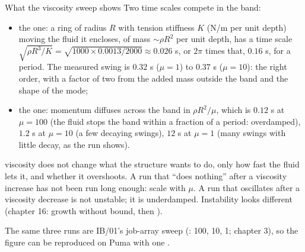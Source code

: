 \documentclass[aspectratio=169,11pt]{beamer}
\begin{document}
\begin{frame}{What the viscosity sweep shows}
\label{fr:musweep3}
\small Two time scales compete in the band:
\begin{itemize}
  \item the  one: a ring of radius $R$ with tension stiffness $K$ (N/m per unit depth) moving the fluid it encloses, of mass $\sim \rho R^2$ per unit depth, has a time scale $\sqrt{\rho R^3/K} = \sqrt{1000 \times 0.0013/2000} \approx 0.026$ s, or $2\pi$ times that, $0.16$ s, for a period. The measured swing is $0.32$ s ($\mu = 1$) to $0.37$ s ($\mu = 10$): the right order, with a factor of two from the added mass outside the band and the shape of the mode;
  \item the  one: momentum diffuses across the band in $\rho R^2/\mu$, which is $0.12$ s at $\mu = 100$ (the fluid stops the band within a fraction of a period: overdamped), $1.2$ s at $\mu = 10$ (a few decaying swings), $12$ s at $\mu = 1$ (many swings with little decay, as the run shows).
\end{itemize}
\vspace{1mm}
\begin{punchbox}
\small {} viscosity does not change what the structure wants to do, only how fast the fluid lets it, and whether it overshoots. A run that ``does nothing'' after a viscosity increase has not been run long enough: scale  with $\mu$. A run that oscillates after a viscosity decrease is not unstable; it is underdamped. Instability looks different (chapter 16: growth without bound, then ).
\end{punchbox}
\vspace{1mm}
\footnotesize The same three runs are IB/01's job-array sweep (: 100, 10, 1; chapter 3), so the figure can be reproduced on Puma with one .
\end{frame}
\end{document}
